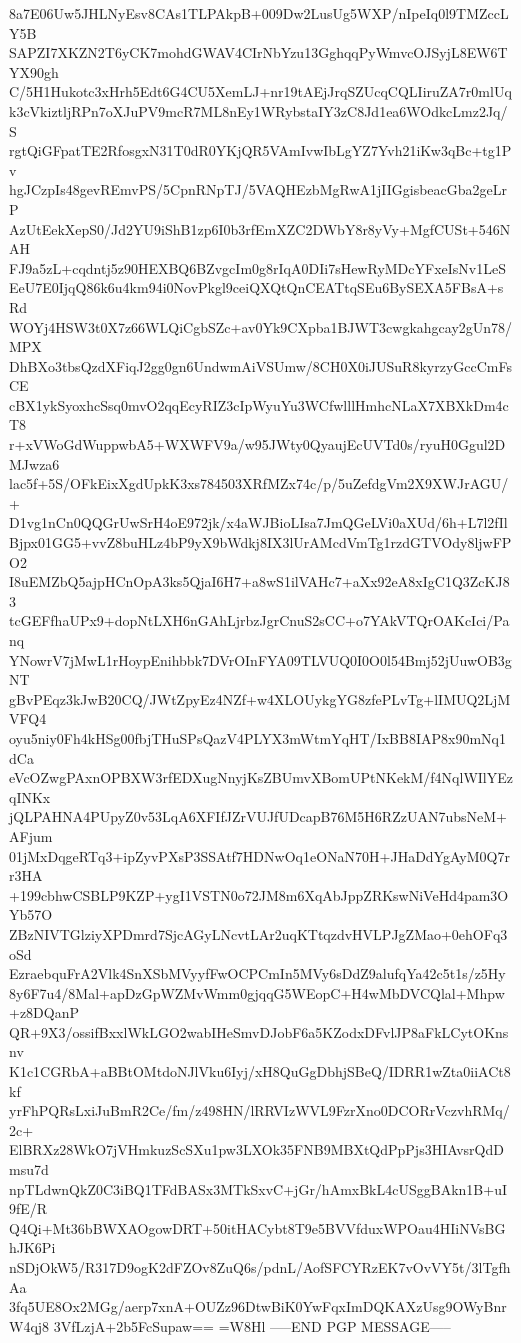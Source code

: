 8a7E06Uw5JHLNyEsv8CAs1TLPAkpB+009Dw2LusUg5WXP/nIpeIq0l9TMZccLY5B
SAPZI7XKZN2T6yCK7mohdGWAV4CIrNbYzu13GghqqPyWmvcOJSyjL8EW6TYX90gh
C/5H1Hukotc3xHrh5Edt6G4CU5XemLJ+nr19tAEjJrqSZUcqCQLIiruZA7r0mlUq
k3cVkiztljRPn7oXJuPV9mcR7ML8nEy1WRybstaIY3zC8Jd1ea6WOdkcLmz2Jq/S
rgtQiGFpatTE2RfosgxN31T0dR0YKjQR5VAmIvwIbLgYZ7Yvh21iKw3qBc+tg1Pv
hgJCzpIs48gevREmvPS/5CpnRNpTJ/5VAQHEzbMgRwA1jIIGgisbeacGba2geLrP
AzUtEekXepS0/Jd2YU9iShB1zp6I0b3rfEmXZC2DWbY8r8yVy+MgfCUSt+546NAH
FJ9a5zL+cqdntj5z90HEXBQ6BZvgcIm0g8rIqA0DIi7sHewRyMDcYFxeIsNv1LeS
EeU7E0IjqQ86k6u4km94i0NovPkgl9ceiQXQtQnCEATtqSEu6BySEXA5FBsA+sRd
WOYj4HSW3t0X7z66WLQiCgbSZc+av0Yk9CXpba1BJWT3cwgkahgcay2gUn78/MPX
DhBXo3tbsQzdXFiqJ2gg0gn6UndwmAiVSUmw/8CH0X0iJUSuR8kyrzyGccCmFsCE
cBX1ykSyoxhcSsq0mvO2qqEcyRIZ3cIpWyuYu3WCfwlllHmhcNLaX7XBXkDm4cT8
r+xVWoGdWuppwbA5+WXWFV9a/w95JWty0QyaujEcUVTd0s/ryuH0Ggul2DMJwza6
lac5f+5S/OFkEixXgdUpkK3xs784503XRfMZx74c/p/5uZefdgVm2X9XWJrAGU/+
D1vg1nCn0QQGrUwSrH4oE972jk/x4aWJBioLIsa7JmQGeLVi0aXUd/6h+L7l2fIl
Bjpx01GG5+vvZ8buHLz4bP9yX9bWdkj8IX3lUrAMcdVmTg1rzdGTVOdy8ljwFPO2
I8uEMZbQ5ajpHCnOpA3ks5QjaI6H7+a8wS1ilVAHc7+aXx92eA8xIgC1Q3ZcKJ83
tcGEFfhaUPx9+dopNtLXH6nGAhLjrbzJgrCnuS2sCC+o7YAkVTQrOAKcIci/Panq
YNowrV7jMwL1rHoypEnihbbk7DVrOInFYA09TLVUQ0I0O0l54Bmj52jUuwOB3gNT
gBvPEqz3kJwB20CQ/JWtZpyEz4NZf+w4XLOUykgYG8zfePLvTg+lIMUQ2LjMVFQ4
oyu5niy0Fh4kHSg00fbjTHuSPsQazV4PLYX3mWtmYqHT/IxBB8IAP8x90mNq1dCa
eVcOZwgPAxnOPBXW3rfEDXugNnyjKsZBUmvXBomUPtNKekM/f4NqlWIlYEzqINKx
jQLPAHNA4PUpyZ0v53LqA6XFIfJZrVUJfUDcapB76M5H6RZzUAN7ubsNeM+AFjum
01jMxDqgeRTq3+ipZyvPXsP3SSAtf7HDNwOq1eONaN70H+JHaDdYgAyM0Q7rr3HA
+199cbhwCSBLP9KZP+ygI1VSTN0o72JM8m6XqAbJppZRKswNiVeHd4pam3OYb57O
ZBzNIVTGlziyXPDmrd7SjcAGyLNcvtLAr2uqKTtqzdvHVLPJgZMao+0ehOFq3oSd
EzraebquFrA2Vlk4SnXSbMVyyfFwOCPCmIn5MVy6sDdZ9alufqYa42c5t1s/z5Hy
8y6F7u4/8Mal+apDzGpWZMvWmm0gjqqG5WEopC+H4wMbDVCQlal+Mhpw+z8DQanP
QR+9X3/ossifBxxlWkLGO2wabIHeSmvDJobF6a5KZodxDFvlJP8aFkLCytOKnsnv
K1c1CGRbA+aBBtOMtdoNJlVku6Iyj/xH8QuGgDbhjSBeQ/IDRR1wZta0iiACt8kf
yrFhPQRsLxiJuBmR2Ce/fm/z498HN/lRRVIzWVL9FzrXno0DCORrVczvhRMq/2c+
ElBRXz28WkO7jVHmkuzScSXu1pw3LXOk35FNB9MBXtQdPpPjs3HIAvsrQdDmsu7d
npTLdwnQkZ0C3iBQ1TFdBASx3MTkSxvC+jGr/hAmxBkL4cUSggBAkn1B+uI9fE/R
Q4Qi+Mt36bBWXAOgowDRT+50itHACybt8T9e5BVVfduxWPOau4HIiNVsBGhJK6Pi
nSDjOkW5/R317D9ogK2dFZOv8ZuQ6s/pdnL/AofSFCYRzEK7vOvVY5t/3lTgfhAa
3fq5UE8Ox2MGg/aerp7xnA+OUZz96DtwBiK0YwFqxImDQKAXzUsg9OWyBnrW4qj8
3VfLzjA+2b5FcSupaw==
=W8Hl
-----END PGP MESSAGE-----
